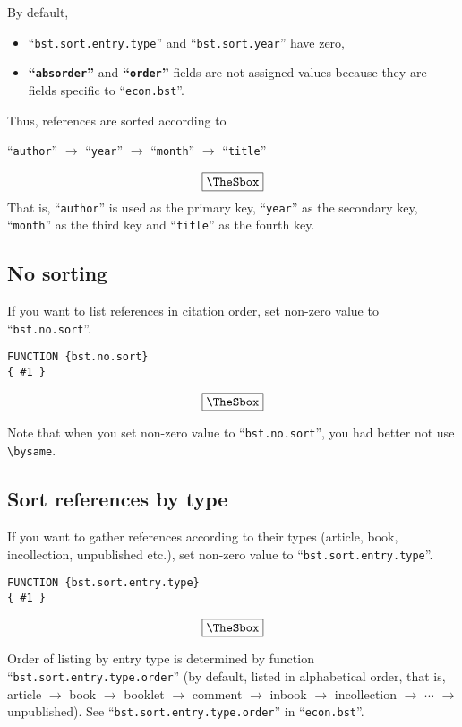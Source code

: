\documentclass[10pt]{article}
\newenvironment{Frame}%
{\setlength{\fboxsep}{15pt}
\setlength{\mylength}{\linewidth}%
\addtolength{\mylength}{-2\fboxsep}%
\addtolength{\mylength}{-2\fboxrule}%
\Sbox
\minipage{\mylength}%
\setlength{\abovedisplayskip}{0pt}%
\setlength{\belowdisplayskip}{0pt}%
}%
{\endminipage\endSbox
\[\fbox{\TheSbox}\]}
\begin{document}
By default, 
\begin{itemize}
 \item ``\texttt{bst.sort.entry.type}'' and ``\texttt{bst.sort.year}'' have
       zero,
 \item \textbf{``\texttt{absorder}''} and \textbf{``\texttt{order}''}
       fields are not assigned values because they are fields specific
       to ``\texttt{econ.bst}''.
\end{itemize}
Thus, references are sorted according to
\begin{Frame}
 \begin{center}
 ``\texttt{author}'' $\rightarrow$ ``\texttt{year}'' $\rightarrow$
 ``\texttt{month}'' $\rightarrow$  ``\texttt{title}'' 
\end{center}
\end{Frame}
That is, ``\texttt{author}'' is used as the primary key, ``\texttt{year}'' as
the secondary key, ``\texttt{month}'' as the third key and ``\texttt{title}'' as
the fourth key.

\subsection{No sorting}

If you want to list references in citation order, set non-zero value to
``\texttt{bst.no.sort}''.
\begin{Frame}
\begin{verbatim}
FUNCTION {bst.no.sort}
{ #1 }
\end{verbatim}
\end{Frame}

Note that when you set non-zero value to ``\texttt{bst.no.sort}'', you had better not
use \verb|\bysame|.

\subsection{Sort references by type}

If you want to gather references according to their types (article,
book, incollection, unpublished etc.), set non-zero value to
``\texttt{bst.sort.entry.type}''.
\begin{Frame}
\begin{verbatim}
FUNCTION {bst.sort.entry.type}
{ #1 }
\end{verbatim}
\end{Frame}

Order of listing by entry type is determined by function
``\texttt{bst.sort.entry.type.order}'' (by default, listed in alphabetical
order, that is, article $\rightarrow$ book $\rightarrow$ booklet
$\rightarrow$ comment $\rightarrow$ inbook $\rightarrow$ incollection
$\rightarrow$ $\cdots$ $\rightarrow$ unpublished).  See
``\texttt{bst.sort.entry.type.order}'' in ``\texttt{econ.bst}''.
\end{document}
